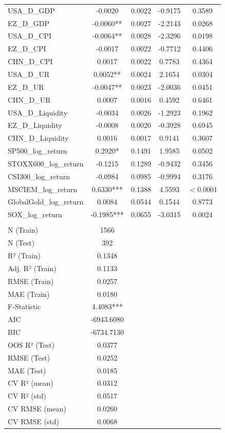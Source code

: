 {\begin{tabular}{lcccc}
  USA\_D\_GDP & -0.0020 & 0.0022 & -0.9175 & 0.3589 \\ 
  EZ\_D\_GDP & -0.0060** & 0.0027 & -2.2143 & 0.0268 \\ 
  USA\_D\_CPI & -0.0064** & 0.0028 & -2.3296 & 0.0198 \\ 
  EZ\_D\_CPI & -0.0017 & 0.0022 & -0.7712 & 0.4406 \\ 
  CHN\_D\_CPI & 0.0017 & 0.0022 & 0.7783 & 0.4364 \\ 
  USA\_D\_UR & 0.0052** & 0.0024 & 2.1654 & 0.0304 \\ 
  EZ\_D\_UR & -0.0047** & 0.0023 & -2.0036 & 0.0451 \\ 
  CHN\_D\_UR & 0.0007 & 0.0016 & 0.4592 & 0.6461 \\ 
  USA\_D\_Liquidity & -0.0034 & 0.0026 & -1.2923 & 0.1962 \\ 
  EZ\_D\_Liquidity & -0.0008 & 0.0020 & -0.3928 & 0.6945 \\ 
  CHN\_D\_Liquidity & 0.0016 & 0.0017 & 0.9141 & 0.3607 \\ 
  SP500\_log\_return & 0.2920* & 0.1491 & 1.9585 & 0.0502 \\ 
  STOXX600\_log\_return & -0.1215 & 0.1289 & -0.9432 & 0.3456 \\ 
  CSI300\_log\_return & -0.0984 & 0.0985 & -0.9994 & 0.3176 \\ 
  MSCIEM\_log\_return & 0.6330*** & 0.1388 & 4.5593 & $<$0.0001 \\ 
  GlobalGold\_log\_return & 0.0084 & 0.0544 & 0.1544 & 0.8773 \\ 
  SOX\_log\_return & -0.1985*** & 0.0655 & -3.0315 & 0.0024 \\ 
   &  &  &  &  \\ 
  N (Train) & 1566 &  &  &  \\ 
  N (Test) & 392 &  &  &  \\ 
  R² (Train) & 0.1348 &  &  &  \\ 
  Adj. R² (Train) & 0.1133 &  &  &  \\ 
  RMSE (Train) & 0.0257 &  &  &  \\ 
  MAE (Train) & 0.0180 &  &  &  \\ 
  F-Statistic & 4.4083*** &  &  &  \\ 
  AIC & -6943.6080 &  &  &  \\ 
  BIC & -6734.7130 &  &  &  \\ 
  OOS R² (Test) & 0.0377 &  &  &  \\ 
  RMSE (Test) & 0.0252 &  &  &  \\ 
  MAE (Test) & 0.0185 &  &  &  \\ 
  CV R² (mean) & 0.0312 &  &  &  \\ 
  CV R² (std) & 0.0517 &  &  &  \\ 
  CV RMSE (mean) & 0.0260 &  &  &  \\ 
  CV RMSE (std) & 0.0068 &  &  &  \\ 
  \bottomrule
\end{tabular}}
